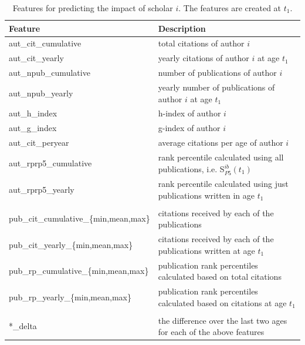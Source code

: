 \begin{refsection}
\begin{table}[htbp]
  \centering
    \begin{tabular}{l|l}
    Feature & Description \\
    \midrule
    aut\_cit\_cumulative & total citations of author $i$ \\
    aut\_cit\_yearly & yearly citations of author $i$ at age $t_1$ \\
    aut\_npub\_cumulative & number of publications of author $i$ \\
    aut\_npub\_yearly & yearly number of publications of author $i$ at age $t_1$ \\
    aut\_h\_index & h-index of author $i$ \\
    aut\_g\_index & g-index of author $i$ \\
    aut\_cit\_peryear & average citations per age of author $i$ \\
    aut\_rprp5\_cumulative & rank percentile calculated using all publications, i.e. S$_{P5}^{ib}(t_1)$ \\
    aut\_rprp5\_yearly & rank percentile calculated using just publications written in age $t_1$ \\
          &  \\
    pub\_cit\_cumulative\_\{min,mean,max\} & citations received by each of the publications \\
    pub\_cit\_yearly\_\{min,mean,max\} & citations received by each of the publications written at age $t_1$ \\
    pub\_rp\_cumulative\_\{min,mean,max\} & publication rank percentiles calculated based on total citations \\
    pub\_rp\_yearly\_\{min,mean,max\} & publication rank percentiles calculated based on citations at age $t_1$ \\
          &  \\
    *\_delta & the difference over the last two ages for each of the above features \\
    \end{tabular}%
  \caption[Features for predicting the scholar impact]{Features for predicting the impact of scholar $i$. The features are created at $t_1$.}
  \label{tab:features_autrp}%
\end{table}%





\clearpage

\end{refsection}

